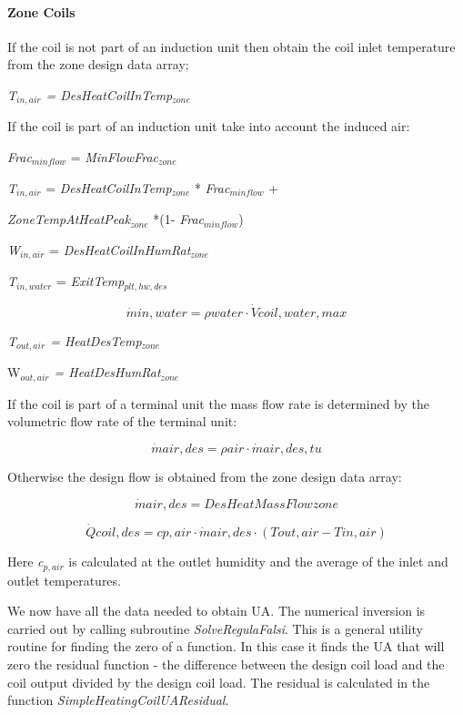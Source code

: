 \paragraph{Zone Coils}\label{zone-coils-1}

If the coil is not part of an induction unit then obtain the coil inlet temperature from the zone design data array;

\emph{T\(_{in,air}\) = DesHeatCoilInTemp\(_{zone}\)}

If the coil is part of an induction unit take into account the induced air:

\emph{Frac\(_{minflow}\)} = \emph{MinFlowFrac\(_{zone}\)}

\emph{T\(_{in,air}\)} = \emph{DesHeatCoilInTemp\(_{zone}\)} * \emph{Frac\(_{minflow}\)} +

\emph{ZoneTempAtHeatPeak\(_{zone}\)} *(1- \emph{Frac\(_{minflow}\)})

\emph{W\(_{in,air}\)} = \emph{DesHeatCoilInHumRat\(_{zone}\)}

\emph{T\(_{in,water}\)} = \emph{ExitTemp\(_{plt,hw,des}\)}

\begin{equation}
\dot min,water = \rho water\cdot \dot Vcoil,water,max
\end{equation}

\emph{T\(_{out,air}\) = HeatDesTemp\(_{zone}\)}

W\emph{\(_{out,air}\) = HeatDesHumRat\(_{zone}\)}

If the coil is part of a terminal unit the mass flow rate is determined by the volumetric flow rate of the terminal unit:

\begin{equation}
\dot mair,des = \rho air\cdot \dot mair,des,tu
\end{equation}

Otherwise the design flow is obtained from the zone design data array:

\begin{equation}
\dot mair,des = DesHeatMassFlowzone
\end{equation}

\begin{equation}
\dot Qcoil,des = cp,air\cdot \dot mair,des\cdot (Tout,air - Tin,air)
\end{equation}

Here \emph{c\(_{p,air}\)} is calculated at the outlet humidity and the average of the inlet and outlet temperatures.

We now have all the data needed to obtain UA. The numerical inversion is carried out by calling subroutine \emph{SolveRegulaFalsi}. This is a general utility routine for finding the zero of a function. In this case it finds the UA that will zero the residual function - the difference between the design coil load and the coil output divided by the design coil load. The residual is calculated in the function \emph{SimpleHeatingCoilUAResidual}.

